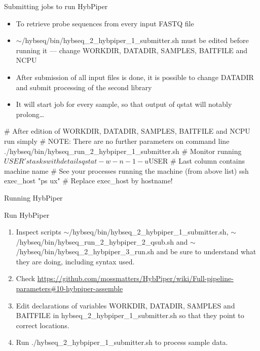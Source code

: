 \documentclass[compress, ucs, xelatex, 11pt, xcolor=x11names, aspectratio=169,
	hyperref={
		bookmarks=true,
		unicode=true,
		colorlinks=true,
		pdftitle={HybSeq course},
		plainpages=false,
		pdfauthor={Vojtech Zeisek},
		pdfsubject={Practical processing of HybSeq target enrichment sequencing data on computing grids like MetaCentrum},
		pdfcreator={XeLaTeX},
		pdfkeywords={BASH, command line, GNU, HybSeq, Linux, MetaCentrum, sequencing shell, target enrichment},
		linkcolor=Turquoise4, %
		anchorcolor=DodgerBlue4, %
		citecolor=DodgerBlue4, %
		filecolor=DodgerBlue4, %
		menucolor=Tan4, %
		urlcolor=DarkOliveGreen4, %
		pdftex},
	url={hyphens, lowtilde} %
	]{beamer}
\renewcommand{\texttt}[1]{\colorbox{Cornsilk2}{{\ttfamily #1}}}
\renewcommand{\alert}[1]{\textcolor{OrangeRed3}{#1}}
\begin{document}
\begin{frame}[fragile]{Submitting jobs to run HybPiper}
	\begin{itemize}
		\item To retrieve probe sequences from every input FASTQ file
		\item \alert{\texttt{$\sim$/hybseq/bin/hybseq\_2\_hybpiper\_1\_submitter.sh} must be edited before running it --- change \texttt{WORKDIR}, \texttt{DATADIR}, \texttt{SAMPLES}, \texttt{BAITFILE} and \texttt{NCPU}}
		\item After submission of all input files is done, it is possible to change \texttt{DATADIR} and submit processing of the second library
		\item It will start job for every sample, so that output of \texttt{qstat} will notably prolong\ldots
	\end{itemize}
	\begin{bashcode}
    # After edition of WORKDIR, DATADIR, SAMPLES, BAITFILE and NCPU run simply
    # NOTE: There are no further parameters on command line
    ./hybseq/bin/hybseq_run_2_hybpiper_1_submitter.sh
    # Monitor running $USER's tasks with details
    qstat -w -n -1 -u $USER # Last column contains machine name
    # See your processes running the machine (from above list)
    ssh exec_host "ps ux" # Replace exec_host by hostname!
	\end{bashcode}
\end{frame}

\begin{frame}{Running HybPiper}
	\begin{exampleblock}{Run HybPiper}
		\begin{enumerate}
			\item Inspect scripts \texttt{$\sim$/hybseq/bin/hybseq\_2\_hybpiper\_1\_submitter.sh}, \texttt{$\sim$/hybseq/bin/hybseq\_run\_2\_hybpiper\_2\_qsub.sh} and \texttt{$\sim$/hybseq/bin/hybseq\_2\_hybpiper\_3\_run.sh} and be sure to understand what they are doing, including syntax used.
			\item Check \url{https://github.com/mossmatters/HybPiper/wiki/Full-pipeline-parameters\#10-hybpiper-assemble}
			\item Edit declarations of variables \texttt{WORKDIR}, \texttt{DATADIR}, \texttt{SAMPLES} and \texttt{BAITFILE} in \texttt{hybseq\_2\_hybpiper\_1\_submitter.sh} so that they point to correct locations.
			\item Run \texttt{./hybseq\_2\_hybpiper\_1\_submitter.sh} to process sample data.
		\end{enumerate}
	\end{exampleblock}
\end{frame}
\end{document}
